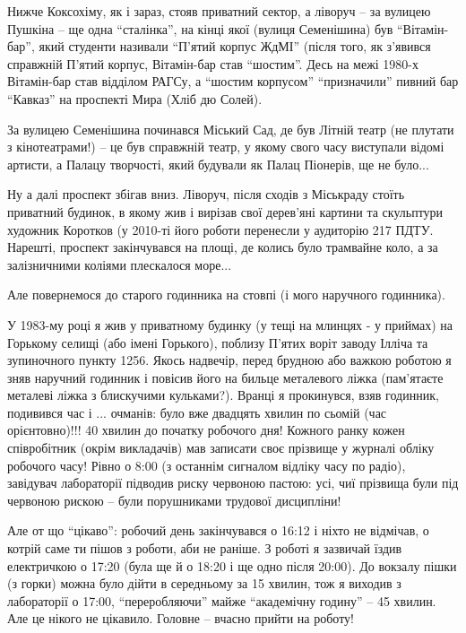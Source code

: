 Нижче Коксохіму, як і зараз, стояв приватний сектор, а ліворуч – за вулицею
Пушкіна – ще одна \enquote{сталінка}, на кінці якої (вулиця Семенішина) був
\enquote{Вітамін-бар}, який студенти називали \enquote{П'ятий корпус ЖдМІ} (після того, як
з'явився справжній П'ятий корпус, Вітамін-бар став \enquote{шостим}. Десь на межі
1980-х Вітамін-бар став відділом РАГСу, а \enquote{шостим корпусом} \enquote{призначили} пивний
бар \enquote{Кавказ} на проспекті Мира (Хліб дю Солей). 

За вулицею Семенішина починався Міський Сад, де був Літній театр (не плутати з
кінотеатрами!) – це був справжній театр, у якому свого часу виступали відомі
артисти, а Палацу творчості, який будували як Палац Піонерів, ще не було...

Ну а далі проспект збігав вниз. Ліворуч, після сходів з Міськраду стоїть
приватний будинок, в якому жив і вирізав свої дерев'яні картини та скульптури
художник Коротков (у 2010-ті його роботи перенесли у аудиторію 217 ПДТУ.
Нарешті, проспект закінчувався на площі, де колись було трамвайне коло, а за
залізничними коліями плескалося море...

Але повернемося до старого годинника на стовпі (і мого наручного годинника).

У 1983-му році я жив у приватному будинку (у тещі на млинцях - у приймах) на
Горькому селищі (або імені Горького), поблизу П'ятих воріт заводу Ілліча та
зупиночного пункту 1256. Якось надвечір, перед брудною або важкою роботою я
зняв наручний годинник і повісив його на бильце металевого ліжка (пам'ятаєте
металеві ліжка з блискучими кульками?). Вранці я прокинувся, взяв годинник,
подивився час і ... очманів: було вже двадцять хвилин по сьомій (час
орієнтовно)!!! 40 хвилин до початку робочого дня! Кожного ранку кожен
співробітник (окрім викладачів) мав записати своє прізвище у журналі обліку
робочого часу! Рівно о 8:00 (з останнім сигналом відліку часу по радіо),
завідувач лабораторії підводив риску червоною пастою: усі, чиї прізвища були
під червоною рискою – були порушниками трудової дисципліни! 

Але от що \enquote{цікаво}: робочий день закінчувався о 16:12 і ніхто не відмічав, о
котрій саме ти пішов з роботи, аби не раніше. З роботі я зазвичай їздив
електричкою о 17:20 (була ще й о 18:20 і ще одно після 20:00). До вокзалу пішки
(з горки) можна було дійти в середньому за 15 хвилин, тож я виходив з
лабораторії о 17:00, \enquote{переробляючи} майже \enquote{академічну годину} – 45 хвилин. Але
це нікого не цікавило. Головне – вчасно прийти на роботу!

